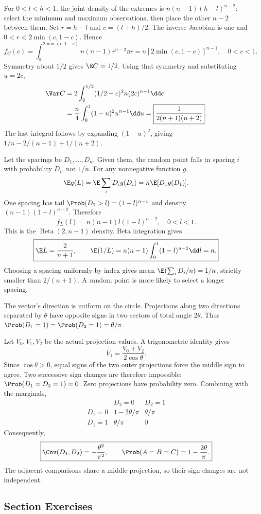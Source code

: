 For $0<l<h<1$, the joint density of the extremes is $n(n-1)(h-l)^{n-2}$: select the minimum and maximum observations, then place the other $n-2$ between them. Set $r=h-l$ and $c=(l+h)/2$. The inverse Jacobian is one and $0<r<2\min(c,1-c)$. Hence
\[
\boxed{f_C(c)=\int_0^{2\min(c,1-c)}n(n-1)r^{n-2}\dd r
=n[2\min(c,1-c)]^{n-1},\quad0<c<1.}
\]
Symmetry about $1/2$ gives $\E C=1/2$. Using that symmetry and substituting $u=2c$,
\[
\begin{aligned}
\Var C&=2\int_0^{1/2}(1/2-c)^2n(2c)^{n-1}\dd c\\
&=\frac n4\int_0^1(1-u)^2u^{n-1}\dd u
=\boxed{\frac1{2(n+1)(n+2)}}.
\end{aligned}
\]
The last integral follows by expanding $(1-u)^2$, giving $1/n-2/(n+1)+1/(n+2)$.

Let the spacings be $D_1,\ldots,D_n$. Given them, the random point falls in spacing $i$ with probability $D_i$, not $1/n$. For any nonnegative function $g$,
\[
\E g(L)=\E\sum_iD_i g(D_i)=n\E[D_1g(D_1)].
\]
One spacing has tail $\Prob(D_1>l)=(1-l)^{n-1}$ and density $(n-1)(1-l)^{n-2}$. Therefore
\[
\boxed{f_L(l)=n(n-1)l(1-l)^{n-2},\quad0<l<1.}
\]
This is the $\operatorname{Beta}(2,n-1)$ density. Beta integration gives
\[
\boxed{\E L=\frac2{n+1},\qquad
\E(1/L)=n(n-1)\int_0^1(1-l)^{n-2}\dd l=n.}
\]
Choosing a spacing uniformly by index gives mean $\E(\sum_iD_i/n)=1/n$, strictly smaller than $2/(n+1)$. A random point is more likely to select a longer spacing.

The vector's direction is uniform on the circle. Projections along two directions separated by $\theta$ have opposite signs in two sectors of total angle $2\theta$. Thus $\Prob(D_1=1)=\Prob(D_2=1)=\theta/\pi$.

Let $V_0,V_1,V_2$ be the actual projection values. A trigonometric identity gives
\[
V_1=\frac{V_0+V_2}{2\cos\theta}.
\]
Since $\cos\theta>0$, equal signs of the two outer projections force the middle sign to agree. Two successive sign changes are therefore impossible: $\Prob(D_1=D_2=1)=0$. Zero projections have probability zero. Combining with the marginals,
\[
\boxed{\begin{array}{c|cc}
& D_2=0&D_2=1\\ \hline
D_1=0&1-2\theta/\pi&\theta/\pi\\
D_1=1&\theta/\pi&0
\end{array}}
\]
Consequently,
\[
\boxed{\Cov(D_1,D_2)=-\frac{\theta^2}{\pi^2},\qquad
\Prob(A=B=C)=1-\frac{2\theta}{\pi}.}
\]
The adjacent comparisons share a middle projection, so their sign changes are not independent.

\par{}
\subsection*{Section Exercises}










